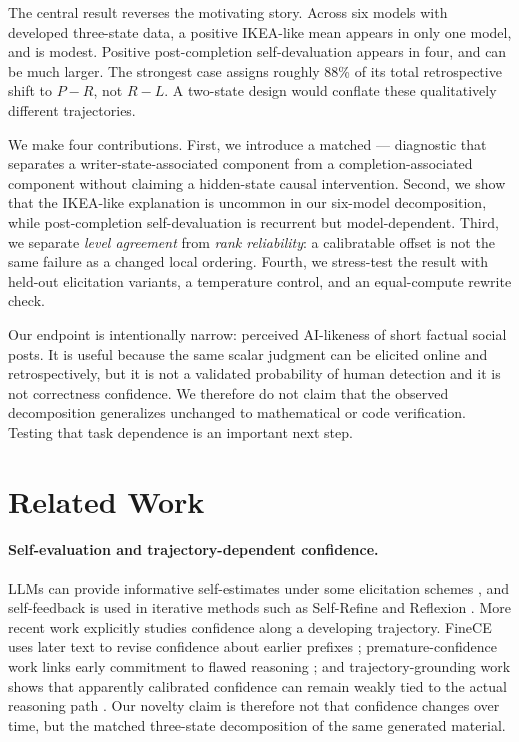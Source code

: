 The central result reverses the motivating story. Across six models with developed three-state data, a positive IKEA-like mean appears in only one model, and is modest. Positive post-completion self-devaluation appears in four, and can be much larger. The strongest case assigns roughly 88\% of its total retrospective shift to $P-R$, not $R-L$. A two-state design would conflate these qualitatively different trajectories.

We make four contributions. First, we introduce a matched \live{}--\replay{}--\post{} diagnostic that separates a writer-state-associated component from a completion-associated component without claiming a hidden-state causal intervention. Second, we show that the IKEA-like explanation is uncommon in our six-model decomposition, while post-completion self-devaluation is recurrent but model-dependent. Third, we separate \emph{level agreement} from \emph{rank reliability}: a calibratable offset is not the same failure as a changed local ordering. Fourth, we stress-test the result with held-out elicitation variants, a temperature control, and an equal-compute rewrite check.

Our endpoint is intentionally narrow: perceived AI-likeness of short factual social posts. It is useful because the same scalar judgment can be elicited online and retrospectively, but it is not a validated probability of human detection and it is not correctness confidence. We therefore do not claim that the observed decomposition generalizes unchanged to mathematical or code verification. Testing that task dependence is an important next step.

\section{Related Work}
\paragraph{Self-evaluation and trajectory-dependent confidence.}
LLMs can provide informative self-estimates under some elicitation schemes \citep{kadavath2022know}, and self-feedback is used in iterative methods such as Self-Refine and Reflexion \citep{madaan2023selfrefine,shinn2023reflexion}. More recent work explicitly studies confidence along a developing trajectory. FineCE uses later text to revise confidence about earlier prefixes \citep{han2025finece}; premature-confidence work links early commitment to flawed reasoning \citep{gai2026premature}; and trajectory-grounding work shows that apparently calibrated confidence can remain weakly tied to the actual reasoning path \citep{yang2026mirage}. Our novelty claim is therefore not that confidence changes over time, but the matched three-state decomposition of the same generated material.

